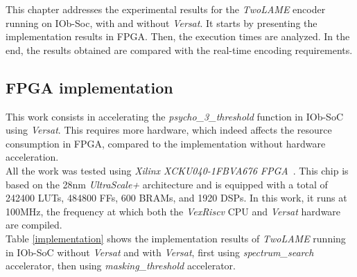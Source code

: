 



This chapter addresses the experimental results for the \textit{TwoLAME} encoder running on IOb-Soc, with and without \textit{Versat}.
It starts by presenting the implementation results in FPGA. Then, the execution times are analyzed. In the end, the results obtained are compared with the real-time encoding requirements.

\subsection{FPGA implementation}
This work consists in accelerating the \textit{psycho\_3\_threshold} function in IOb-SoC using \textit{Versat}. This requires more hardware, which indeed affects the resource consumption in FPGA, compared to the implementation without hardware acceleration. \\
All the work was tested using \textit{Xilinx XCKU040-1FBVA676 FPGA}~\cite{xcku040}. This chip is based on the 28nm \textit{UltraScale+} architecture and is equipped with a total of 242400 LUTs, 484800 FFs, 600 BRAMs, and 1920 DSPs. In this work, it runs at 100MHz, the frequency at which both the \textit{VexRiscv} CPU and \textit{Versat} hardware are compiled.\\ 

Table \ref{implementation} shows the implementation results of \textit{TwoLAME} running in IOb-SoC without \textit{Versat} and with \textit{Versat}, first using \textit{spectrum\_search} accelerator, then using \textit{masking\_threshold} accelerator.

\vspace{1cm}

